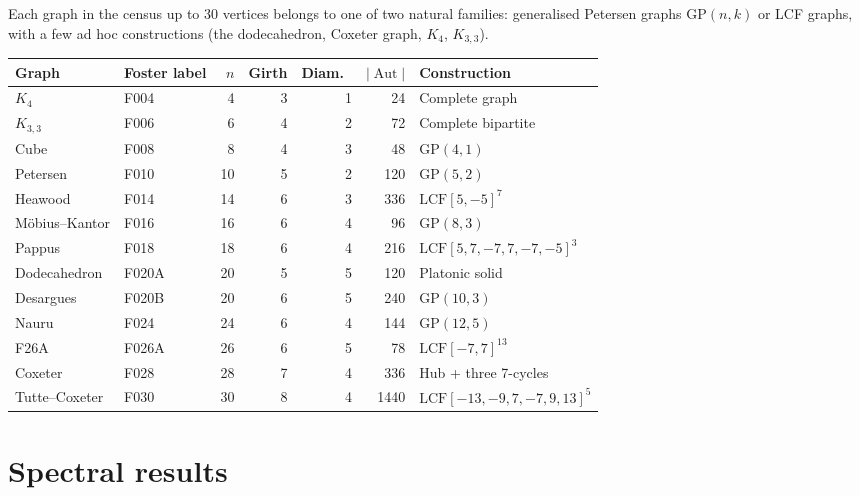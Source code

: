 \documentclass[11pt,a4paper]{article}
\theoremstyle{plain}
\theoremstyle{definition}
\theoremstyle{remark}
\newcommand{\Aut}{\operatorname{Aut}}
\newcommand{\GP}{\mathrm{GP}}
\begin{document}
Each graph in the census up to 30 vertices belongs to one of two natural
families: generalised Petersen graphs $\GP(n,k)$ or LCF graphs, with
a few ad hoc constructions (the dodecahedron, Coxeter graph, $K_4$,
$K_{3,3}$).

\begin{tcolorbox}[breakable, colback=black!5, colframe=black!5,
  boxrule=0pt, sharp corners]
\centering
{}
\label{tab:census}
\small
\begin{tabular}{llrrrrl}
\toprule
Graph & Foster label & $n$ & Girth & Diam.\ & $|\Aut|$ & Construction \\
\midrule
$K_4$             & F004   &  4 & 3 & 1 & 24    & Complete graph \\
$K_{3,3}$         & F006   &  6 & 4 & 2 & 72    & Complete bipartite \\
Cube              & F008   &  8 & 4 & 3 & 48    & $\GP(4,1)$ \\
Petersen          & F010   & 10 & 5 & 2 & 120   & $\GP(5,2)$ \\
Heawood           & F014   & 14 & 6 & 3 & 336   & $\mathrm{LCF}[5,-5]^7$ \\
M\"{o}bius--Kantor & F016   & 16 & 6 & 4 & 96    & $\GP(8,3)$ \\
Pappus            & F018   & 18 & 6 & 4 & 216   & $\mathrm{LCF}[5,7,-7,7,-7,-5]^3$ \\
Dodecahedron      & F020A  & 20 & 5 & 5 & 120   & Platonic solid \\
Desargues         & F020B  & 20 & 6 & 5 & 240   & $\GP(10,3)$ \\
Nauru             & F024   & 24 & 6 & 4 & 144   & $\GP(12,5)$ \\
F26A              & F026A  & 26 & 6 & 5 & 78    & $\mathrm{LCF}[-7,7]^{13}$ \\
Coxeter           & F028   & 28 & 7 & 4 & 336   & Hub + three 7-cycles \\
Tutte--Coxeter    & F030   & 30 & 8 & 4 & 1440  & $\mathrm{LCF}[-13,-9,7,-7,9,13]^5$ \\
\bottomrule
\end{tabular}
\end{tcolorbox}


\section{Spectral results}
\end{document}
